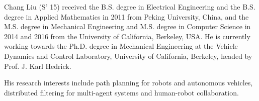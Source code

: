 \documentclass[journal]{IEEEtran}
\begin{document}
\begin{IEEEbiography}{Chang Liu} 
(S' 15) received the B.S. degree in Electrical Engineering and the B.S. degree in Applied Mathematics in 2011 from Peking University, China, and the M.S. degree in Mechanical Engineering and M.S. degree in Computer Science in 2014 and 2016 from the University of California, Berkeley, USA. He is currently working towards the Ph.D. degree in Mechanical Engineering at the Vehicle Dynamics and Control Laboratory, University of California, Berkeley, headed by Prof. J. Karl Hedrick.

His research interests include path planning for robots and autonomous vehicles, distributed filtering for multi-agent systems and human-robot collaboration.
\end{IEEEbiography}
\end{document}
